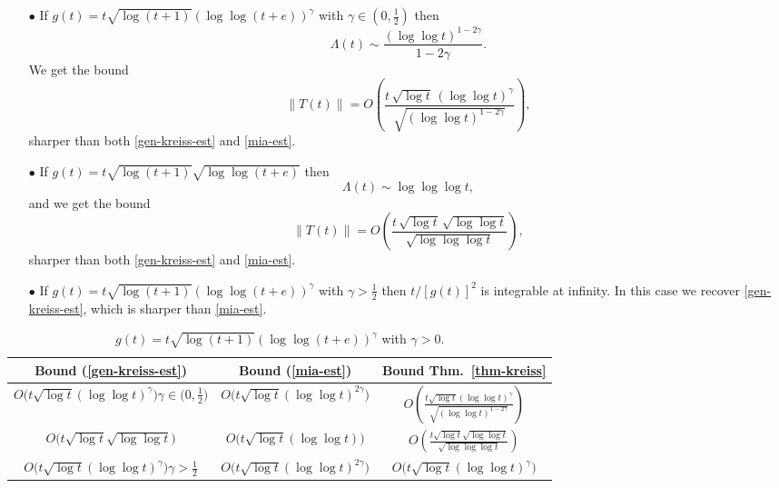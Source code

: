 \documentclass[12pt]{amsart}
\theoremstyle{plain}
\theoremstyle{definition}
\numberwithin{equation}{section}
\begin{document}
\smallskip
\begin{enumerate}
\item[$\bullet$]
If $g(t)=t \sqrt{\log(t+1)} (\log \log(t+e))^{\gamma}$ with $\gamma\in(0,\frac{1}{2})$
then
$$
\Lambda(t) \sim \frac{(\log \log t)^{1-2\gamma}}{1-2\gamma}.
$$
We get the bound
$$
\|T (t)\|= O\left(\frac{t\, \sqrt{\log t}\,
(\log \log t)^\gamma}{\sqrt{(\log \log t)^{1-2\gamma}}}\right),
$$
sharper than both \eqref{gen-kreiss-est} and \eqref{mia-est}.

\medskip
\item[$\bullet$]
If $g(t)=t \sqrt{\log(t+1)} \sqrt{\log \log(t+e)}$
then
$$
\Lambda(t) \sim \log \log \log t,
$$
and we get the bound
$$
\|T (t)\|= O\left(\frac{t\, \sqrt{\log t}\, \sqrt{\log \log t}}{\sqrt{\log \log \log t}}\right),
$$
sharper than both \eqref{gen-kreiss-est} and \eqref{mia-est}.

\medskip
\item[$\bullet$]
If $g(t)=t \sqrt{\log(t+1)} (\log \log(t+e))^{\gamma}$ with $\gamma>\frac12$ then
$t/[g(t)]^2$ is integrable at infinity.
In this case we recover \eqref{gen-kreiss-est},
which is sharper than \eqref{mia-est}.
\end{enumerate}

\begin{table}[htbp]
\centering
\renewcommand{\arraystretch}{2.4}
\setlength{\tabcolsep}{3.5pt}
\begin{tabular}{|c|c|c|}
\hline
 \textbf{Bound (\ref{gen-kreiss-est})}
& \textbf{Bound (\ref{mia-est})} & \textbf{Bound Thm.\ \ref{thm-kreiss}} \\
\hline\hline
$O\big(t \sqrt{\log t} (\log \log t)^\gamma\big)$\quad $\gamma \in \big(0,\frac12\big)$
& $O\big(t \sqrt{\log t} (\log \log t)^{2\gamma}\big)$
& $O\left(\displaystyle\frac{t \sqrt{\log t} (\log \log t)^\gamma}{\sqrt{(\log \log t)^{1-2\gamma}}}\right)$ \\
\hline
$O\big(t \sqrt{\log t} \sqrt{\log \log t}\big)$
& $O\big(t \sqrt{\log t} (\log \log t)\big)$
& $O\left(\displaystyle\frac{t \sqrt{\log t} \sqrt{\log \log t}}{\sqrt{\log \log \log t}}\right)$ \\ [1.2ex]
\hline
$O\big(t \sqrt{\log t} (\log \log t)^\gamma\big)$\quad $\gamma>\frac12$
& $O\big(t \sqrt{\log t} (\log \log t)^{2\gamma}\big)$
& $O\big(t \sqrt{\log t} (\log \log t)^\gamma\big)$ \\
\hline
\end{tabular}
\vspace{0.25cm}
\caption{$g(t)=t \sqrt{\log(t+1)} (\log \log(t+e))^{\gamma}$ with $\gamma>0$.}
\end{table}
\end{document}
